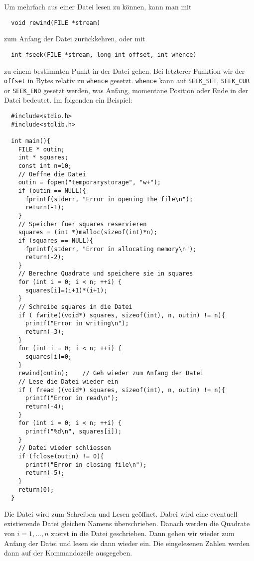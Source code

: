 Um mehrfach aus einer Datei lesen zu können, kann man mit 
\begin{lstlisting}
  void rewind(FILE *stream)
\end{lstlisting}
zum Anfang der Datei zurückkehren, oder mit
\begin{lstlisting}
  int fseek(FILE *stream, long int offset, int whence)
\end{lstlisting}
zu einem bestimmten Punkt in der Datei gehen.
Bei letzterer Funktion wir der \verb|offset| in Bytes relativ zu \verb|whence| gesetzt.
\verb|whence| kann auf \verb|SEEK_SET|, \verb|SEEK_CUR| or \verb|SEEK_END| gesetzt werden, was Anfang, momentane Position oder Ende in der Datei bedeutet.
Im folgenden ein Beispiel:
\begin{lstlisting}
  #include<stdio.h>
  #include<stdlib.h>

  int main(){
    FILE * outin;
    int * squares;
    const int n=10;
    // Oeffne die Datei
    outin = fopen("temporarystorage", "w+");
    if (outin == NULL){
      fprintf(stderr, "Error in opening the file\n");
      return(-1);
    }
    // Speicher fuer squares reservieren
    squares = (int *)malloc(sizeof(int)*n);
    if (squares == NULL){
      fprintf(stderr, "Error in allocating memory\n");
      return(-2);
    }
    // Berechne Quadrate und speichere sie in squares
    for (int i = 0; i < n; ++i) {
      squares[i]=(i+1)*(i+1);
    }
    // Schreibe squares in die Datei
    if ( fwrite((void*) squares, sizeof(int), n, outin) != n){
      printf("Error in writing\n");
      return(-3);
    }
    for (int i = 0; i < n; ++i) {
      squares[i]=0;
    }
    rewind(outin);    // Geh wieder zum Anfang der Datei
    // Lese die Datei wieder ein
    if ( fread ((void*) squares, sizeof(int), n, outin) != n){
      printf("Error in read\n");
      return(-4);
    }
    for (int i = 0; i < n; ++i) {
      printf("%d\n", squares[i]);
    }
    // Datei wieder schliessen
    if (fclose(outin) != 0){
      printf("Error in closing file\n");
      return(-5);
    }
    return(0);
  }   
\end{lstlisting}
Die Datei wird zum Schreiben und Lesen geöffnet.
Dabei wird eine eventuell existierende Datei gleichen Namens überschrieben.
Danach werden die Quadrate von $i=1,...,n$ zuerst in die Datei geschrieben.
Dann gehen wir wieder zum Anfang der Datei und lesen sie dann wieder ein.
Die eingelesenen Zahlen werden dann auf der Kommandozeile ausgegeben.
